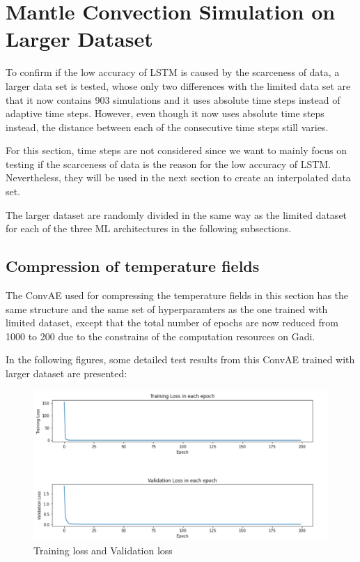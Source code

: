 \section{Mantle Convection Simulation on Larger Dataset}

To confirm if the low accuracy of LSTM is caused by the scarceness of data, a larger data set is tested, whose only two differences with the limited data set are that it now contains 903 simulations and it uses absolute time steps instead of adaptive time steps. However, even though it now uses absolute time steps instead, the distance between each of the consecutive time steps still varies.

For this section, time steps are not considered since we want to mainly focus on testing if the scarceness of data is the reason for the low accuracy of LSTM. Nevertheless, they will be used in the next section to create an interpolated data set.

The larger dataset are randomly divided in the same way as the limited dataset for each of the three ML architectures in the following subsections.

\subsection{Compression of temperature fields}

The ConvAE used for compressing the temperature fields in this section has the same structure and the same set of hyperparamters as the one trained with limited dataset, except that the total number of epochs are now reduced from 1000 to 200 due to the constrains of the computation resources on Gadi.

In the following figures, some detailed test results from this ConvAE trained with larger dataset are presented:

\begin{figure}[H]
    \caption{Training loss and Validation loss}
    \includegraphics[scale=0.6]{Report LaTeX/figures/mantle_convection_images/larger_dataset/ConvAE_trainingData.png}
\end{figure}

